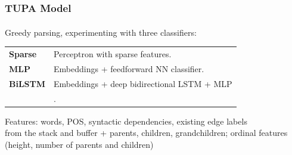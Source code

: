 \documentclass[t]{beamer}
\newcommand{\parser}[1]{TUPA\textsubscript{#1}}
\begin{document}
\begin{frame}
\frametitle{\parser{} Model}
Greedy parsing, experimenting with three classifiers:
\begin{flushleft}
	\begin{tabular}{ll}
	\textbf{Sparse} & Perceptron with sparse features. \\
	\textbf{MLP} & Embeddings + feedforward NN classifier. \\
	\textbf{BiLSTM} & Embeddings + deep bidirectional LSTM + MLP \\& \cite{kiperwasser2016simple}.
	\end{tabular}
	\vfill
	Features:
	words, POS, syntactic dependencies, existing edge labels \\
	from the stack and buffer + parents, children, grandchildren;
	ordinal features (height, number of parents and children)
\end{flushleft}
\end{frame}
\end{document}

